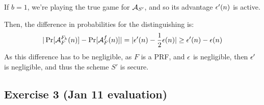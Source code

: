 \begin{solution}
	If $b=1$, we're playing the true game for $\mathcal{A}_{S'}$, and so its advantage $\epsilon'(n)$ is active.

	Then, the difference in probabilities for the distinguishing is:
	\[ |\Pr[\mathcal{A}_F^{F_k}(n)] - \Pr[\mathcal{A}_F^{f}(n)]| = |\epsilon'(n) - \frac12 \epsilon(n)| \ge \epsilon'(n)-\epsilon(n) \]
	As this difference has to be negligible, as $F$ is a PRF, and $\epsilon$ is negligible, then $\epsilon'$ is negligible, and thus the scheme $S'$ is secure.
\end{solution}



\subsection{Exercise 3 (Jan 11 evaluation)}


